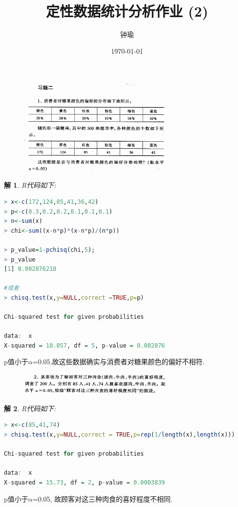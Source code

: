 \documentclass[11pt,a4paper]{ctexart}
\title{定性数据统计分析作业 (2)}
\author{钟瑜 \quad 222018314210044}
\date{\today}
\newtheorem*{solution}{解}
\begin{document}
\maketitle
\pagestyle{plain}%
\begin{figure}[H]
	\includegraphics[width=0.7\textwidth]{1.png}
\end{figure}

\begin{solution}
R代码如下:
\end{solution}
\begin{lstlisting}[language=r]
> x<-c(172,124,85,41,36,42)
> p<-c(0.3,0.2,0.2,0.1,0.1,0.1)
> n<-sum(x)
> chi<-sum((x-n*p)*(x-n*p)/(n*p)) 

> p_value=1-pchisq(chi,5);
> p_value   
[1] 0.002876218

#或者
> chisq.test(x,y=NULL,correct =TRUE,p=p)

Chi-squared test for given probabilities

data:  x
X-squared = 18.057, df = 5, p-value = 0.002876
\end{lstlisting}
p值小于$ \alpha $=0.05,故这些数据确实与消费者对糖果颜色的偏好不相符.


\begin{figure}[H]
	\includegraphics[width=0.7\textwidth]{2.png}
\end{figure}
\begin{solution}
R代码如下:
\end{solution}
\begin{lstlisting}[language=r]
> x<-c(85,41,74)
> chisq.test(x,y=NULL,correct = TRUE,p=rep(1/length(x),length(x)))

Chi-squared test for given probabilities

data:  x
X-squared = 15.73, df = 2, p-value = 0.0003839
\end{lstlisting}
p值小于$ \alpha $=0.05, 故顾客对这三种肉食的喜好程度不相同.
\end{document}
